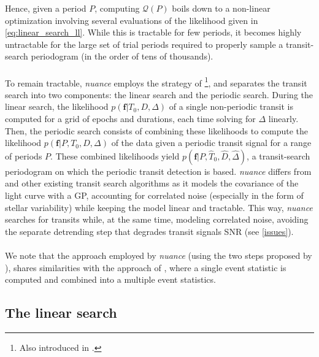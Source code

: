 \documentclass[modern]{aastex631}
\newcommand{\nuancemethod}{\textit{nuance}}
\begin{document}
Hence, given a period $P$, computing $\mathcal{Q}(P)$ boils down to a non-linear optimization involving several evaluations of the likelihood given in \autoref{eq:linear_search_ll}. While this is tractable for few periods, it becomes highly untractable for the large set of trial periods required to properly sample a transit-search periodogram (in the order of tens of thousands).\\\\
To remain tractable, \nuancemethod{} employs the strategy of \cite{foreman2016}\footnote{Also introduced in \cite{Aigrain2004}.}, and separates the transit search into two components: the linear search and the periodic search. During the linear search, the likelihood $p(\bm{f} \vert T_0, D, \Delta)$ of a single non-periodic transit is computed for a grid of epochs and durations, each time solving for $\Delta$ linearly. Then, the periodic search consists of combining these likelihoods to compute the likelihood $p(\bm{f} \vert P, T_0, D, \Delta)$ of the data given a periodic transit signal for a range of periods $P$. These combined likelihoods yield $p(\bm{f} \vert P, \hat T_0 ,\hat D, \hat \Delta)$, a transit-search periodogram on which the periodic transit detection is based. \nuancemethod{} differs from \cite{foreman2016} and other existing transit search algorithms as it models the covariance of the light curve with a GP, accounting for correlated noise (especially in the form of stellar variability) while keeping the model linear and tractable. This way, \nuancemethod{} searches for transits while, at the same time, modeling correlated noise, avoiding the separate detrending step that degrades transit signals SNR (see \autoref{issues}).\\\\
We note that the approach employed by \nuancemethod{} (using the two steps proposed by \citealt{foreman2016}), shares similarities with the approach of \cite{Jenkins2010}, where a single event statistic is computed and combined into a multiple event statistics.

\subsection{The linear search}\label{linear_search}
\end{document}
